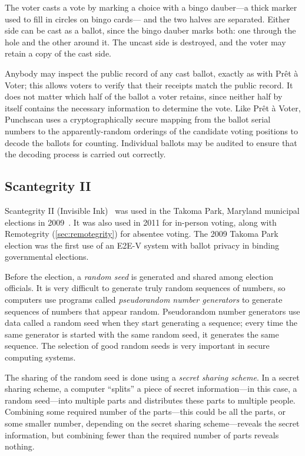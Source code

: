 The voter casts a vote by marking a choice with a bingo dauber---a
thick marker used to fill in circles on bingo cards--- and the two
halves are separated. Either side can be cast as a ballot, since the
bingo dauber marks both: one through the hole and the other around
it. The uncast side is destroyed, and the voter may retain a copy of
the cast side.

Anybody may inspect the public record of any cast ballot, exactly as
with Prêt à Voter; this allows voters to verify that their receipts
match the public record. It does not matter which half of the ballot a
voter retains, since neither half by itself contains the necessary
information to determine the vote. Like Prêt à Voter, Punchscan uses a
cryptographically secure mapping from the ballot serial numbers to the
apparently-random orderings of the candidate voting positions to
decode the ballots for counting. Individual ballots may be audited to
ensure that the decoding process is carried out correctly.

\subsection{Scantegrity II}
\label{sec:scantegrity-ii}

Scantegrity II (Invisible Ink)~\cite{chaum2008,chaum2009} was used in
the Takoma Park, Maryland municipal elections in
2009~\cite{carback2010}. It was also used in 2011 for in-person
voting, along with Remotegrity (\autoref{sec:remotegrity}) for
absentee voting. The 2009 Takoma Park election was the first use of an
E2E-V system with ballot privacy in binding governmental elections.

Before the election, a \emph{random seed} is generated and shared
among election officials. It is very difficult to generate truly
random sequences of numbers, so computers use programs called
\emph{pseudorandom number generators} to generate sequences of numbers
that appear random. Pseudorandom number generators use data called a
random seed when they start generating a sequence; every time the same
generator is started with the same random seed, it generates the same
sequence. The selection of good random seeds is very important in
secure computing systems.

The sharing of the random seed is done using a \emph{secret sharing
  scheme}.  In a secret sharing scheme, a computer ``splits'' a piece
of secret information---in this case, a random seed---into multiple
parts and distributes these parts to multiple people. Combining some
required number of the parts---this could be all the parts, or some
smaller number, depending on the secret sharing scheme---reveals the
secret information, but combining fewer than the required number of
parts reveals nothing.

